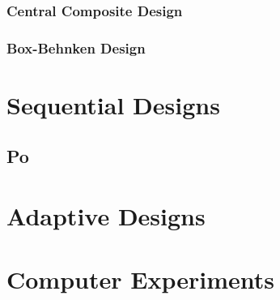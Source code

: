 \subsubsection{Central Composite Design}

\subsubsection{Box-Behnken Design}




\section{Sequential Designs}

\subsection{Po}



\section{Adaptive Designs}



\section{Computer Experiments}

